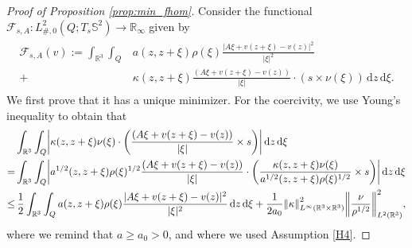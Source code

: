 \documentclass[reqno,11pt]{amsart}
\numberwithin{equation}{section}
\theoremstyle{thmlemcorr}
\numberwithin{theorem}{section}
\theoremstyle{thmlemcorr*}
\theoremstyle{defi}
\theoremstyle{remexample}
\theoremstyle{ass}
\newcommand{\R}{\mathbb{R}}
\renewcommand{\S}{\mathbb{S}}
\newcommand{\Fcal}{\mathcal{F}}
\newcommand{\dd}{\,\mathrm{d}}
\DeclarePairedDelimiter{\abs}{\lvert}{\rvert}
\DeclarePairedDelimiter{\norm}{\lVert}{\rVert}
\newcommand{\1}{\mathds{1}}
\newcommand{\Om}{\Omega}
\begin{document}
\begin{proof}[Proof of Proposition \ref{prop:min_fhom}]
    Consider the functional $\Fcal_{s,A}:L^2_{\#,0}(Q;T_s\S^2) \to \R_{\infty}$ given by
    \begin{align*}
    \begin{split}
    \Fcal_{s,A}(v):=\int_{\R^3}\int_{Q}&a(z,z+\xi)\rho(\xi)\frac{|A\xi +v(z+\xi)-v(z)|^2}{|\xi|^2}\\
    +&\kappa(z,z+\xi)\frac{(A\xi+v(z+\xi)-v(z))}{|\xi|} \cdot(s \times \nu(\xi)) \dd z\dd \xi.
    \end{split}
    \end{align*}
    We first prove that it has a unique minimizer. For the coercivity, we use Young's inequality to obtain that
    \begin{align*}
        &\int_{\R^3} \int_{Q} \abs*{\kappa(z,z+\xi)\nu(\xi) \cdot \left(\frac{(A\xi+v(z+\xi)-v(z))}{\abs{\xi}}\times s\right)} \dd z\dd \xi \\ = & \int_{\R^3} \int_{Q} \abs*{ a^{1/2}(z, z + \xi) \rho(\xi)^{1/2} \frac{(A\xi+v(z+\xi)-v(z))}{\abs{\xi}}  \cdot \left( \frac{\kappa(z,z+\xi)\nu(\xi)}{a^{1/2}(z, z + \xi) \rho(\xi)^{1/2}} \times s\right) } \dd z\dd \xi \\ \leq & \, \frac{1}{2} \int_{\R^3}\int_{Q}a(z,z+\xi)\rho(\xi)\frac{|A\xi +v(z+\xi)-v(z)|^2}{|\xi|^2} \dd z\dd \xi  +  \frac{1}{2 a_0} \norm*{\kappa}^2_{L^\infty(\R^3\times \R^3)}\norm*{\frac{\nu}{\rho^{1/2}}}^{2}_{L^{2}(\R^3)},
\end{align*}
where we remind that \(a\ge a_0>0\), and where we used Assumption \ref{H4}.

    

\end{proof}
\end{document}
